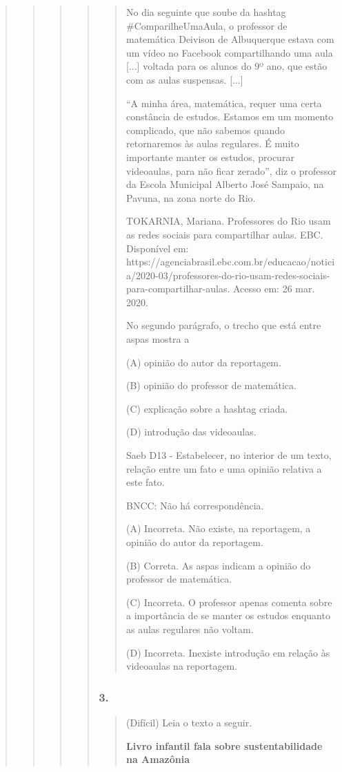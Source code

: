 \begin{quote}
\begin{quote}
\begin{quote}
\begin{quote}
\begin{quote}
No dia seguinte que soube da hashtag \#ComparilheUmaAula, o professor de
matemática Deivison de Albuquerque estava com um vídeo no Facebook
compartilhando uma aula {[}...{]} voltada para os alunos do 9º ano, que
estão com as aulas suspensas. {[}...{]}

``A minha área, matemática, requer uma certa constância de estudos.
Estamos em um momento complicado, que não sabemos quando retornaremos às
aulas regulares. É muito importante manter os estudos, procurar
videoaulas, para não ficar zerado'', diz o professor da Escola Municipal
Alberto José Sampaio, na Pavuna, na zona norte do Rio.

TOKARNIA, Mariana. Professores do Rio usam as redes sociais para
compartilhar aulas. EBC. Disponível em:
https://agenciabrasil.ebc.com.br/educacao/noticia/2020-03/professores-do-rio-usam-redes-sociais-para-compartilhar-aulas.
Acesso em: 26 mar. 2020.

\protect\hypertarget{_Hlk128058360}{}{}No segundo parágrafo, o trecho
que está entre aspas mostra a

(A) opinião do autor da reportagem.

(B) opinião do professor de matemática.

(C) explicação sobre a hashtag criada.

(D) introdução das videoaulas.

Saeb D13 - Estabelecer, no interior de um texto, relação entre um fato e
uma opinião relativa a este fato.

BNCC: Não há correspondência.

(A) Incorreta. Não existe, na reportagem, a opinião do autor da
reportagem.

(B) Correta. As aspas indicam a opinião do professor de matemática.

(C) Incorreta. O professor apenas comenta sobre a importância de se
manter os estudos enquanto as aulas regulares não voltam.

(D) Incorreta. Inexiste introdução em relação às videoaulas na
reportagem.
\end{quote}

\subsubsection{3.}\label{section-65}

\begin{quote}
(Difícil) Leia o texto a seguir.

\textbf{Livro infantil fala sobre sustentabilidade na Amazônia}


\end{quote}
\end{quote}
\end{quote}
\end{quote}
\end{quote}
